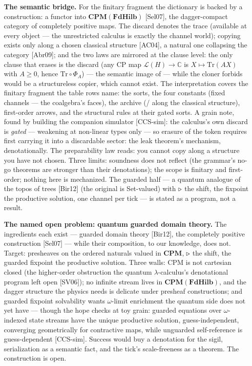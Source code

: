 \documentclass[11pt]{article}
\begin{document}
\textbf{The semantic bridge.} For the finitary fragment the dictionary is
backed by a construction: a functor into $\mathbf{CPM}(\mathbf{FdHilb})$
[Sel07], the dagger-compact category of completely positive maps. The
discard denotes the trace (available at every object --- the unrestricted
calculus is exactly the channel world); copying exists only along a chosen
classical structure [AC04], a natural one collapsing the category [Abr09];
and the two laws are mirrored at the clause level: the only clause that
erases is the discard (any CP map $\mathcal{L}(H) \to \mathbb{C}$ is
$X \mapsto \mathrm{Tr}(AX)$ with $A \geq 0$, hence
$\mathrm{Tr} \circ \Phi_A$) --- the
semantic image of
 --- while the cloner 
forbids would be a structureless copier, which cannot exist. The
interpretation covers the finitary fragment the table rows name: the sorts,
the four constants (fixed channels --- the coalgebra's faces), the archive
(/ along the classical structure), first-order arrows,
and the structural rules at their gated sorts. A grain note, found by
building the companion simulator [CCS-sim]: the calculus's own discard is
\emph{gated} --- weakening at non-linear types only --- so erasure of the
token requires first carrying it into a discardable sector: the leak
theorem's mechanism, denotationally. The
preparability law reads: you cannot copy along a structure you
have not chosen. Three limits: soundness does not reflect (the grammar's
no-go theorems are stronger than their denotations); the scope is finitary
and first-order; nothing here is mechanized. The guarded half --- a quantum
analogue of the topos of trees [Bir12] (the original is Set-valued) with
$\triangleright$ the shift, the fixpoint the productive
solution, one channel per tick --- is stated as a program, not a result.

\textbf{The named open problem: quantum guarded domain theory.} The
ingredients each exist --- guarded domain theory [Bir12], the completely
positive construction [Sel07] --- while their composition, to our knowledge, does not. Target:
presheaves on the ordered naturals valued in $\mathbf{CPM}$, $\triangleright$ the
shift, the guarded fixpoint the productive solution. Three walls: CPM is
not cartesian closed (the higher-order obstruction the quantum
$\lambda$-calculus's denotational program left open [SV06]); no infinite
stream lives in $\mathbf{CPM}(\mathbf{FdHilb})$, and the dagger structure
the physics needs is delicate under presheaf constructions; and guarded
fixpoint solvability wants $\omega$-limit enrichment the quantum side does
not yet have --- though the hope checks at toy grain: guarded equations over
$\omega$-indexed state streams have the unique productive solution,
guess-independent, converging geometrically for contractive maps, while
unguarded self-reference is guess-dependent [CCS-sim]. Success would buy a denotation for the sigil, serialization
as a semantic fact, and the tick's scale-freeness as a theorem. The
construction is open.
\end{document}
